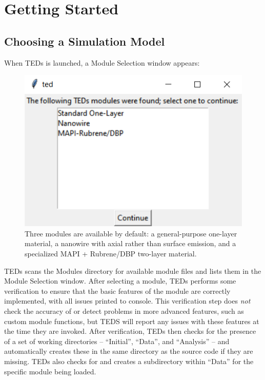 \documentclass[11pt,letterpaper,titlepage]{article}
\begin{document}
	\newpage
	\section{Getting Started}
		\subsection{Choosing a Simulation Model}
		\par
		When TEDs is launched, a Module Selection window appears:
		\begin{figure}[H]
			\label{fig:mod_select}
			\centering
			\includegraphics[scale=1]{"mod_select"}
			\caption{Three modules are available by default: a general-purpose one-layer material, a nanowire with axial rather than surface emission, and a specialized MAPI + Rubrene/DBP two-layer material.}
		\end{figure}
	
		\par
		TEDs scans the Modules directory for available module files and lists them in the Module Selection window. After selecting a module, TEDs performs some verification to ensure that the basic features of the module are correctly implemented, with all issues printed to console. This verification step does \textit{not} check the accuracy of or detect problems in more advanced features, such as custom module functions, but TEDS will report any issues with these features at the time they are invoked. After verification, TEDs then checks for the presence of a set of working directories – “Initial”, “Data”, and “Analysis” – and automatically creates these in the same directory as the source code if they are missing. TEDs also checks for and creates a subdirectory within “Data” for the specific module being loaded.
	
\end{document}
